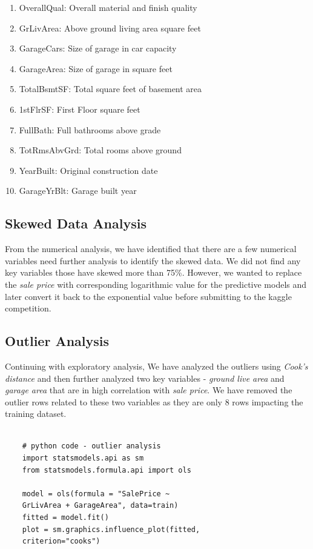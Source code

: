 \documentclass[sigconf]{acmart}
\begin{document}
	\begin{enumerate}
		\item OverallQual: Overall material and finish quality
		\item GrLivArea: Above ground living area square feet
		\item GarageCars: Size of garage in car capacity
		\item GarageArea: Size of garage in square feet
		\item TotalBsmtSF: Total square feet of basement area
		\item 1stFlrSF: First Floor square feet
		\item FullBath: Full bathrooms above grade
		\item TotRmsAbvGrd: Total rooms above ground
		\item YearBuilt: Original construction date
		\item GarageYrBlt: Garage built year		
	\end{enumerate}
	
	\subsection{Skewed Data Analysis}
	From the numerical analysis, we have identified that there are a few numerical variables need further analysis to identify the skewed data. We did not find any key variables those have skewed more than 75\%. However, we wanted to replace the {\em sale price} with corresponding logarithmic value for the predictive models and later convert it back to the exponential value before submitting to the kaggle competition. 
	
	\subsection{Outlier Analysis}
	
	Continuing with exploratory analysis, We have analyzed the outliers using {\em Cook's distance} and then further analyzed two key variables - {\em ground live area} and {\em garage area} that are in high correlation with {\em sale price}. We have removed the outlier rows related to these two variables as they are only 8 rows impacting the training dataset.
	
	\begin{verbatim}
	
	# python code - outlier analysis
	import statsmodels.api as sm
	from statsmodels.formula.api import ols
	
	model = ols(formula = "SalePrice ~ 
	GrLivArea + GarageArea", data=train)
	fitted = model.fit()    	
	plot = sm.graphics.influence_plot(fitted, 
	criterion="cooks")		
	\end{verbatim}
	
\end{document}
